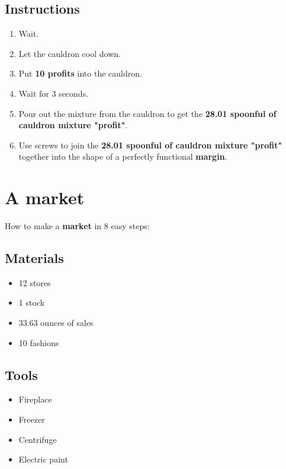 \documentclass{article}
\begin{document}
\subsection{Instructions}\begin{enumerate}
\item 
Wait.
\item 
Let the cauldron cool down.
\item 
Put \textbf{10 profits} into the cauldron.
\item 
Wait for 3 seconds.
\item 
Pour out the mixture from the cauldron to get the \textbf{28.01 spoonful of cauldron mixture "profit"}.
\item 
Use screws to join the \textbf{28.01 spoonful of cauldron mixture "profit"} together into the shape of a perfectly functional \textbf{margin}.
\end{enumerate}
\newpage
\section{A market}How to make a \textbf{market} in 8 easy steps:

\subsection{Materials}\begin{itemize}
\item 
12 stores
\item 
1 stock
\item 
33.63 ounces of sales
\item 
10 fashions
\end{itemize}
\subsection{Tools}\begin{itemize}
\item 
Fireplace
\item 
Freezer
\item 
Centrifuge
\item 
Electric paint
\end{itemize}
\end{document}

